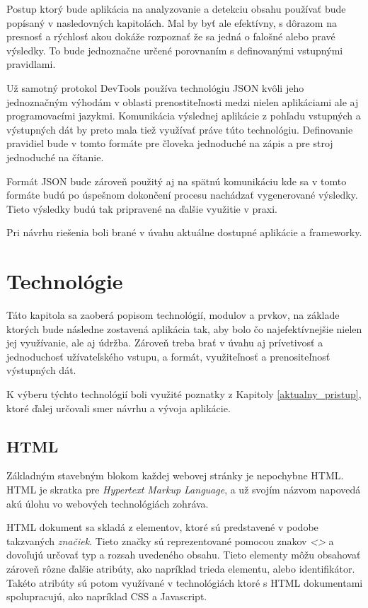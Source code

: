 Postup ktorý bude aplikácia na analyzovanie a detekciu obsahu používať bude popísaný v nasledovných kapitolách. Mal by byť ale efektívny, s dôrazom na presnosť a rýchlosť akou dokáže rozpoznať že sa jedná o falošné alebo pravé výsledky. To bude jednoznačne určené porovnaním s definovanými vstupnými pravidlami.

\bigskip

Už samotný protokol DevTools používa technológiu JSON kvôli jeho jednoznačným výhodám v oblasti prenostiteľnosti medzi nielen aplikáciami ale aj programovacími jazykmi. Komunikácia výslednej aplikácie z pohľadu vstupných a výstupných dát by preto mala tiež využívať práve túto technológiu. Definovanie pravidiel bude v tomto formáte pre človeka jednoduché na zápis a pre stroj jednoduché na čítanie. 

Formát JSON bude zároveň použitý aj na spätnú komunikáciu kde sa v tomto formáte budú po úspešnom dokončení procesu nachádzať vygenerované výsledky. Tieto výsledky budú tak pripravené na ďalšie využitie v praxi.

Pri návrhu riešenia boli brané v úvahu aktuálne dostupné aplikácie a frameworky. 


\chapter{Technológie}
\label{Technologie}

Táto kapitola sa zaoberá popisom technológií, modulov a prvkov, na základe ktorých bude následne zostavená aplikácia tak, aby bolo čo najefektívnejšie nielen jej využívanie, ale aj údržba. Zároveň treba brať v úvahu aj prívetivosť a jednoduchosť užívateľského vstupu, a formát, využiteľnosť a prenositeľnosť výstupných dát. 

K výberu týchto technológií boli využité poznatky z Kapitoly \ref{aktualny_pristup}, ktoré ďalej určovali smer návrhu a vývoja aplikácie.

\section{HTML}

Základným stavebným blokom každej webovej stránky je nepochybne HTML. HTML je skratka pre \textit{Hypertext Markup Language}, a už svojím názvom napovedá akú úlohu vo webových technológiách zohráva. 

HTML dokument sa skladá z elementov, ktoré sú predstavené v podobe takzvaných \textit{značiek}. Tieto značky sú reprezentované pomocou znakov \textit{<>} a dovoľujú určovať typ a rozsah uvedeného obsahu. Tieto elementy môžu obsahovať zároveň rôzne ďalšie atribúty, ako napríklad trieda elementu, alebo identifikátor. Takéto atribúty sú potom využívané v technológiách ktoré s HTML dokumentami spolupracujú, ako napríklad CSS a Javascript.

